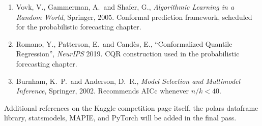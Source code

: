 \begin{enumerate}
  \item Vovk, V., Gammerman, A.\ and Shafer, G., \emph{Algorithmic Learning in a Random World}, Springer, 2005. Conformal prediction framework, scheduled for the probabilistic forecasting chapter.
  \item Romano, Y., Patterson, E.\ and Cand\`es, E., ``Conformalized Quantile Regression'', \emph{NeurIPS} 2019. CQR construction used in the probabilistic forecasting chapter.
  \item Burnham, K.~P.\ and Anderson, D.~R., \emph{Model Selection and Multimodel Inference}, Springer, 2002. Recommends AICc whenever $n / k < 40$.
\end{enumerate}

Additional references on the Kaggle competition page itself, the polars dataframe library, statsmodels, MAPIE, and PyTorch will be added in the final pass.
